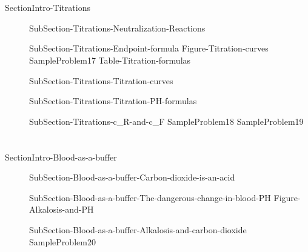 \documentclass[main.tex]{subfiles}
\begin{document}
\section{\color{blue!30!black}{Titrations}}{SectionIntro-Titrations}
\sloppy
\begin{description}
\item[] {SubSection-Titrations-Neutralization-Reactions}
\item[] {SubSection-Titrations-Endpoint-formula}
  {Figure-Titration-curves}
  {SampleProblem17}
     {Table-Titration-formulas}

\item[] {SubSection-Titrations-Titration-curves}
 
   
\item[] 
{SubSection-Titrations-Titration-PH-formulas}
\item[] 
{SubSection-Titrations-c_R-and-c_F}
   {SampleProblem18}
  {SampleProblem19}
 
 
\end{description}
\section{\color{blue!30!black}{Blood as a buffer}}{SectionIntro-Blood-as-a-buffer}
 
\sloppy
\begin{description}
\item[] {SubSection-Blood-as-a-buffer-Carbon-dioxide-is-an-acid}
\item[] 
{SubSection-Blood-as-a-buffer-The-dangerous-change-in-blood-PH}
  {Figure-Alkalosis-and-PH}
\item[] 
{SubSection-Blood-as-a-buffer-Alkalosis-and-carbon-dioxide}
   {SampleProblem20}
 \end{description}
 
\end{document}
